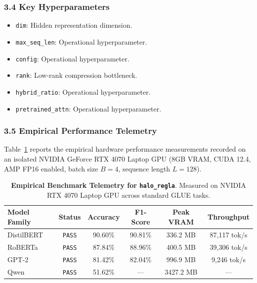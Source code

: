 \subsubsection*{3.4 Key Hyperparameters}
\begin{itemize}
    \item \texttt{dim}: Hidden representation dimension.
    \item \texttt{max\_seq\_len}: Operational hyperparameter.
    \item \texttt{config}: Operational hyperparameter.
    \item \texttt{rank}: Low-rank compression bottleneck.
    \item \texttt{hybrid\_ratio}: Operational hyperparameter.
    \item \texttt{pretrained\_attn}: Operational hyperparameter.
\end{itemize}

\subsubsection*{3.5 Empirical Performance Telemetry}
Table~\ref{tab:telemetry_halo_regla} reports the empirical hardware performance measurements recorded on an isolated NVIDIA GeForce RTX 4070 Laptop GPU (8GB VRAM, CUDA 12.4, AMP FP16 enabled, batch size $B=4$, sequence length $L=128$).

\begin{table}[h]
\centering
\small
\caption{\textbf{Empirical Benchmark Telemetry for \texttt{halo\_regla}}. Measured on NVIDIA RTX 4070 Laptop GPU across standard GLUE tasks.}
\label{tab:telemetry_halo_regla}
\begin{tabular*}{\columnwidth}{@{\extracolsep{\fill}}lccccc}
\toprule
\textbf{Model Family} & \textbf{Status} & \textbf{Accuracy} & \textbf{F1-Score} & \textbf{Peak VRAM} & \textbf{Throughput} \\
\midrule
DistilBERT & \texttt{PASS} & 90.60\% & 90.81\% & 336.2 MB & 87,117 tok/s \\
RoBERTa & \texttt{PASS} & 87.84\% & 88.96\% & 400.5 MB & 39,306 tok/s \\
GPT-2 & \texttt{PASS} & 81.42\% & 82.04\% & 996.9 MB & 9,246 tok/s \\
Qwen & \texttt{PASS} & 51.62\% & --- & 3427.2 MB & --- \\
\bottomrule
\end{tabular*}
\end{table}

